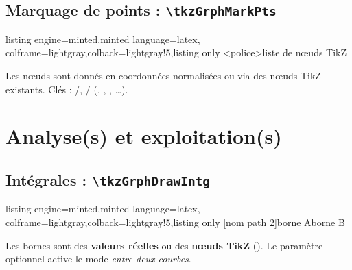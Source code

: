 \documentclass[11pt,a4paper]{ltxdoc}
\begin{document}
\pagebreak

\subsection{Marquage de points : \texttt{\textbackslash tkzGrphMarkPts}}

\begin{tcblisting}{listing engine=minted,minted language=latex,
  colframe=lightgray,colback=lightgray!5,listing only}
\tkzGrphMarkPts[clés]<police>{liste de nœuds TikZ}
\tkzGrphMarquerPts
\end{tcblisting}

Les nœuds sont donnés en coordonnées normalisées ou via des nœuds TikZ existants. Clés : /, / (, , \MontreCode{+}, \ldots).

\pagebreak

\section{Analyse(s) et exploitation(s)}

\subsection{Intégrales : \texttt{\textbackslash tkzGrphDrawIntg}}

\begin{tcblisting}{listing engine=minted,minted language=latex,
  colframe=lightgray,colback=lightgray!5,listing only}
[nom path 2]{borne A}{borne B}
\end{tcblisting}

Les bornes sont des \textbf{valeurs réelles} ou des \textbf{nœuds TikZ} (). Le paramètre optionnel  active le mode \textit{entre deux courbes}.

\smallskip
\end{document}
